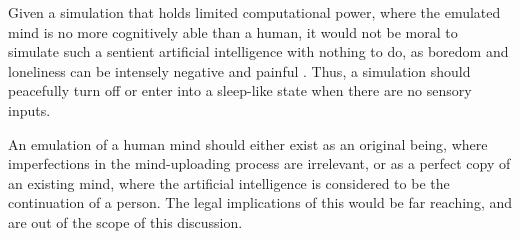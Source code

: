 Given a simulation that holds limited computational power, where the emulated
mind is no more cognitively able than a human, it would not be moral to simulate
such a sentient artificial intelligence with nothing to do, as boredom and
loneliness can be intensely negative and painful
\autocite{hawkley_loneliness_2010}. Thus, a simulation should peacefully turn
off or enter into a sleep-like state when there are no sensory inputs.

An emulation of a human mind should either exist as an original being, where
imperfections in the mind-uploading process are irrelevant, or as a perfect copy
of an existing mind, where the artificial intelligence is considered to be the
continuation of a person. The legal implications of this would be far reaching,
and are out of the scope of this discussion.



